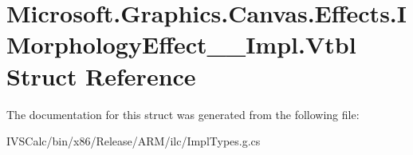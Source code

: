 \hypertarget{struct_microsoft_1_1_graphics_1_1_canvas_1_1_effects_1_1_i_morphology_effect_____impl_1_1_vtbl}{}\section{Microsoft.\+Graphics.\+Canvas.\+Effects.\+I\+Morphology\+Effect\+\_\+\+\_\+\+Impl.\+Vtbl Struct Reference}
\label{struct_microsoft_1_1_graphics_1_1_canvas_1_1_effects_1_1_i_morphology_effect_____impl_1_1_vtbl}


The documentation for this struct was generated from the following file\+:\begin{DoxyCompactItemize}
\item 
I\+V\+S\+Calc/bin/x86/\+Release/\+A\+R\+M/ilc/Impl\+Types.\+g.\+cs\end{DoxyCompactItemize}
